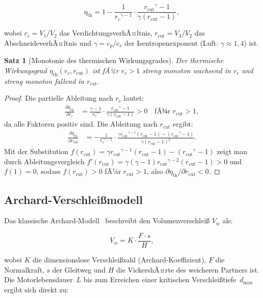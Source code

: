 ﻿\documentclass[12pt,a4paper]{article}
\newtheorem{theorem}{Satz}[section]
\newcommand{\etath}{\ensuremath{\eta_{\mathrm{th}}}}
\newcommand{\rc}{\ensuremath{r_c}}
\newcommand{\rcut}{\ensuremath{r_{\mathrm{cut}}}}
\begin{document}
\begin{equation}
  \etath = 1 - \frac{1}{\rc^{\gamma - 1}} \cdot
  \frac{\rcut^{\gamma} - 1}{\gamma(\rcut - 1)},
  \label{eq:eta_diesel}
\end{equation}

wobei $\rc = V_1 / V_2$ das VerdichtungsverhÃ¤ltnis,
$\rcut = V_3 / V_2$ das AbschneideverhÃ¤ltnis und
$\gamma = c_p / c_v$ der Isentropenexponent (Luft: $\gamma \approx 1{,}4$) ist.

\begin{theorem}[Monotonie des thermischen Wirkungsgrades]
\label{thm:eta_monoton}
Der thermische Wirkungsgrad $\etath(\rc, \rcut)$ ist fÃ¼r $\rc > 1$ streng
monoton wachsend in $\rc$ und streng monoton fallend in $\rcut$.
\end{theorem}

\begin{proof}
Die partielle Ableitung nach $\rc$ lautet:
\begin{align}
  \frac{\partial \etath}{\partial \rc}
  &= \frac{\gamma - 1}{\rc^{\gamma}} \cdot
     \frac{\rcut^{\gamma} - 1}{\gamma(\rcut - 1)} > 0
     \quad \text{fÃ¼r } \rcut > 1,
\end{align}
da alle Faktoren positiv sind. Die Ableitung nach $\rcut$ ergibt:
\begin{align}
  \frac{\partial \etath}{\partial \rcut}
  &= -\frac{1}{\rc^{\gamma-1}} \cdot
     \frac{\gamma \rcut^{\gamma-1}(\rcut-1) - (\rcut^{\gamma}-1)}
          {\gamma (\rcut-1)^2}.
\end{align}
Mit der Substitution $f(\rcut) = \gamma \rcut^{\gamma-1}(\rcut-1) - (\rcut^{\gamma}-1)$
zeigt man durch Ableitungsvergleich $f'(\rcut) = \gamma(\gamma-1)\rcut^{\gamma-2}(\rcut-1) > 0$
und $f(1)=0$, sodass $f(\rcut)>0$ fÃ¼r $\rcut > 1$, also
$\partial\etath/\partial\rcut < 0$.
\end{proof}

\subsection{Archard-Verschlei\ss{}modell}
\label{sec:grundlagen_archard}

Das klassische Archard-Modell~\cite{archard1953} beschreibt den Volumenverschlei\ss{} $V_w$ als:

\begin{equation}
  V_w = K \cdot \frac{F \cdot s}{H},
  \label{eq:archard}
\end{equation}

wobei $K$ die dimensionslose Verschlei\ss{}zahl (Archard-Koeffizient),
$F$ die Normalkraft, $s$ der Gleitweg und $H$ die VickershÃ¤rte des weicheren
Partners ist. Die Motorlebensdauer~$L$ bis zum Erreichen einer kritischen
Verschlei\ss{}tiefe~$d_{\max}$ ergibt sich direkt zu:
\end{document}
